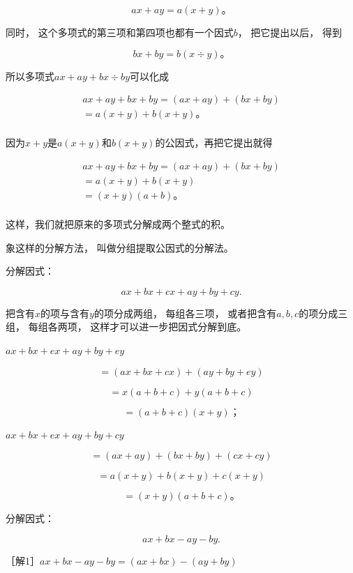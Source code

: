 \[
a x + a y = a (x + y)\text{。}
\]

同时， 这个多项式的第三项和第四项也都有一个因式\(b\)， 把它提出以后，
得到

\[
b x + b y = b (x \div y)\text{。}
\]

所以多项式\(ax + ay + bx \div by\)可以化成

\[
\begin{array}{l} a x + a y + b x + b y = (a x + a y) + (b x + b y) \\ = a (x + y) + b (x + y)\text{。} \\ \end{array}
\]

因为\(x + y\)是\(a (x + y)\)和\(b(x + y)\)的公因式，再把它提出就得

\[
\begin{array}{l} a x + a y + b x + b y = (a x + a y) + (b x + b y) \\ = a (x + y) + b (x + y) \\ = (x + y) (a + b)\text{。} \\ \end{array}
\]

这样，我们就把原来的多项式分解成两个整式的积。

象这样的分解方法， 叫做分组提取公因式的分解法。

 分解因式：

\[
a x + b x + c x + a y + b y + c y.
\]

 把含有\(x\)的项与含有\(y\)的项分成两组， 每组各三项，
或者把含有\(a, b, c\)的项分成三组， 每组各两项，
这样才可以进一步把因式分解到底。

\(ax + bx + ex + ay + by + ey\)

\[
= (a x + b x + c x) + (a y + b y + e y)
\]

\[
= x (a + b + c) + y (a + b + c)
\]

\[
= (a + b + c) (x + y)\text{；}
\]

\(ax + bx + ex + ay + by + cy\)

\[
= (a x + a y) + (b x + b y) + (c x + c y)
\]

\[
= a (x + y) + b (x + y) + c (x + y)
\]

\[
= (x + y) (a + b + c)\text{。}
\]

 分解因式：

\[
a x + b x - a y - b y.
\]

［解1］\(ax + bx - ay - by = (ax + bx) - (ay + by)\)

